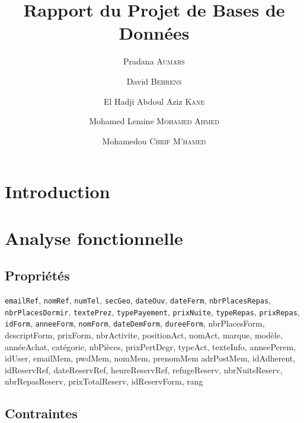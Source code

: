 \documentclass[12pt, a4paper]{article}
\title{Rapport du Projet de Bases de Données}
\author{Pradana \textsc{Aumars}
  \and
  David \textsc{Behrens}
  \and
  El Hadji Abdoul Aziz \textsc{Kane}
  \and
  Mohamed Lemine \textsc{Mohamed Ahmed}
  \and
  Mohamedou \textsc{Chrif M'hamed}}
\newcommand\att[1]{\textnhtt{#1}}
\begin{document}
\maketitle
\section{Introduction}
\section{Analyse fonctionnelle}
\subsection*{Propriétés}
\att{emailRef},
\att{nomRef},
\att{numTel},
\att{secGeo},
\att{dateOuv},
\att{dateFerm},
\att{nbrPlacesRepas},
\att{nbrPlacesDormir},
\att{textePrez},
\att{typePayement},
\att{prixNuite},
\att{typeRepas},
\att{prixRepas},
\att{idForm},
\att{anneeForm},
\att{nomForm},
\att{dateDemForm},
\att{dureeForm}, nbrPlacesForm, descriptForm, prixForm, nbrActivite, positionAct, nomAct, marque, modèle, annéeAchat, catégorie, nbPièces, prixPertDegr, typeAct, texteInfo, anneePerem, idUser, emailMem, pwdMem, nomMem, prenomMem adrPostMem, idAdherent, idReservRef, dateReservRef, heureReservRef, refugeReserv, nbrNuitsReserv, nbrRepasReserv, prixTotalReserv, idReservForm, rang

\subsection*{Contraintes}
\end{document}
